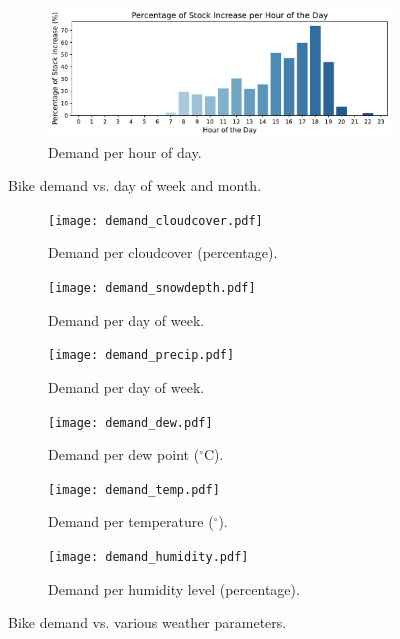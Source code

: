 \begin{figure}[htbp]
\begin{subfigure}{0.45\textwidth}
        \label{fig:demand month}
    \end{subfigure}
    \hfill
    \begin{subfigure}{0.8\textwidth}
        \centering
        \includegraphics[width=\textwidth]{demand_hour.pdf}
        \caption{Demand per hour of day.}
        \label{fig:demand hour}
    \end{subfigure}
    \caption{Bike demand vs. day of week and month.}
    \label{fig:demand day month}
\end{figure}

\begin{figure}[htbp]
    \centering

    \begin{subfigure}{0.30\textwidth}
        \centering
        \texttt{[image: demand\_cloudcover.pdf]}
        \caption{Demand per cloudcover (percentage).}
        \label{fig:demand temp}
    \end{subfigure}
    \hfill
    \begin{subfigure}{0.30\textwidth}
        \centering
        \texttt{[image: demand\_snowdepth.pdf]}
        \caption{Demand per day of week.}
        \label{fig:demand snowdepth}
    \end{subfigure}
    \hfill
    \begin{subfigure}{0.30\textwidth}
        \centering
        \texttt{[image: demand\_precip.pdf]}
        \caption{Demand per day of week.}
        \label{fig:demand precip}
    \end{subfigure}
    \hfill
    \begin{subfigure}{0.30\textwidth}
        \centering
        \texttt{[image: demand\_dew.pdf]}
        \caption{Demand per dew point ($^\circ$C).}
        \label{fig:demand dew}
    \end{subfigure}
    \hfill
    \begin{subfigure}{0.30\textwidth}
        \centering
        \texttt{[image: demand\_temp.pdf]}
        \caption{Demand per temperature ($^\circ$).}
        \label{fig:demand temp}
    \end{subfigure}
    \hfill
    \begin{subfigure}{0.30\textwidth}
        \centering
        \texttt{[image: demand\_humidity.pdf]}
        \caption{Demand per humidity level (percentage).} 
        \label{fig:demand humidity}
    \end{subfigure}
        \caption{Bike demand vs. various weather parameters.}
        \label{fig:demand weather}

\end{figure}

